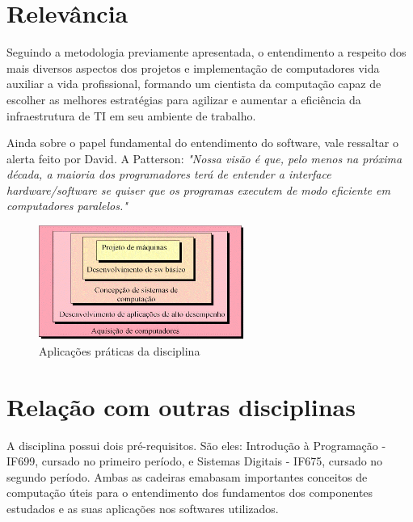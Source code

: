 \documentclass[12pt]{article}
\begin{document}
	\section{Relevância}
	\label{sec:relevancia}
	
	    Seguindo a metodologia previamente apresentada, o entendimento a respeito dos mais diversos aspectos dos projetos e implementação de computadores vida  auxiliar a vida profissional, formando um cientista da computação capaz de escolher as melhores estratégias para agilizar e aumentar a eficiência da infraestrutura de TI em seu ambiente de trabalho.
	    
	    Ainda sobre o papel fundamental do entendimento do software, vale ressaltar o alerta feito por David. A Patterson: \emph{"Nossa visão é que, pelo menos na próxima década, a maioria dos programadores terá de entender a interface hardware/software se quiser que os programas executem de modo eficiente em computadores paralelos."}\citep{organizacao_projeto}
	    
        \begin{figure}[!h]
         \centering
         \includegraphics[width=0.6\textwidth]{figures/aplicacoes.png}
         \caption{Aplicações práticas da disciplina}
         \label{fig:aplicacoes}
        \end{figure}

	\section{Relação com outras disciplinas}
	\label{sec:relacao}
	
        A disciplina possui dois pré-requisitos. São eles: Introdução à Programação - IF699, cursado no primeiro período, e Sistemas Digitais - IF675, cursado no segundo período. Ambas as cadeiras emabasam importantes conceitos de computação úteis para o entendimento dos fundamentos dos componentes estudados e as suas aplicações nos softwares utilizados.
	
    
	
	
\end{document}
